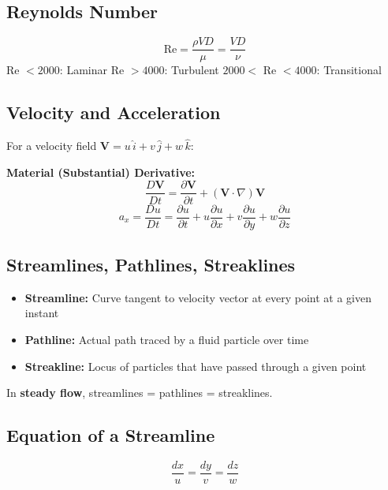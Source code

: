 \documentclass[12pt]{article}
\begin{document}
\subsection{Reynolds Number}

\begin{formulabox}
\[
  \text{Re} = \frac{\rho V D}{\mu} = \frac{VD}{\nu}
\]
Re $< 2000$: Laminar \quad Re $> 4000$: Turbulent \quad $2000 <$ Re $< 4000$: Transitional
\end{formulabox}

\subsection{Velocity and Acceleration}

For a velocity field $\mathbf{V} = u\,\hat{i} + v\,\hat{j} + w\,\hat{k}$:

\begin{formulabox}
\textbf{Material (Substantial) Derivative:}
\[
  \frac{D\mathbf{V}}{Dt} = \frac{\partial \mathbf{V}}{\partial t} + (\mathbf{V}\cdot\nabla)\mathbf{V}
\]
\[
  a_x = \frac{Du}{Dt} = \frac{\partial u}{\partial t} + u\frac{\partial u}{\partial x} + v\frac{\partial u}{\partial y} + w\frac{\partial u}{\partial z}
\]
\end{formulabox}

\subsection{Streamlines, Pathlines, Streaklines}

\begin{itemize}[leftmargin=16pt, itemsep=3pt]
  \item \textbf{Streamline:} Curve tangent to velocity vector at every point at a given instant
  \item \textbf{Pathline:} Actual path traced by a fluid particle over time
  \item \textbf{Streakline:} Locus of particles that have passed through a given point
\end{itemize}

\begin{keybox}
In \textbf{steady flow}, streamlines = pathlines = streaklines.
\end{keybox}

\subsection{Equation of a Streamline}
\begin{formulabox}
\[
  \frac{dx}{u} = \frac{dy}{v} = \frac{dz}{w}
\]
\end{formulabox}
\end{document}
